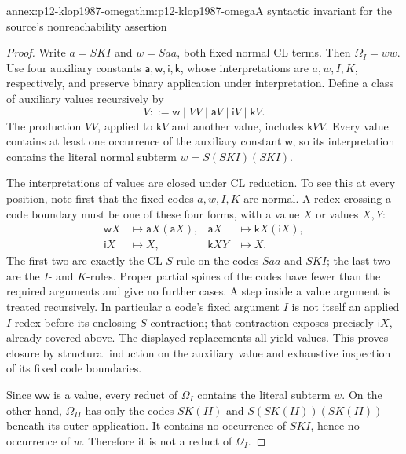 \begin{annexitem}{annex:p12-klop1987-omega}{thm:p12-klop1987-omega}{A syntactic invariant for the source's nonreachability assertion}
\begin{proof}
Write \(a=SKI\) and \(w=Saa\), both fixed normal CL terms.
Then \(\Omega_I=ww\). Use four auxiliary constants
\(\mathsf a,\mathsf w,\mathsf i,\mathsf k\), whose interpretations
are \(a,w,I,K\), respectively, and preserve binary application under
interpretation. Define a class of auxiliary values recursively by
\[
 V::=\mathsf w\mid VV\mid\mathsf a V
       \mid\mathsf i V\mid\mathsf k V.
\]
The production \(VV\), applied to \(\mathsf k V\) and another
value, includes \(\mathsf k V V\). Every value contains at least
one occurrence of the auxiliary constant \(\mathsf w\), so its
interpretation contains the literal normal subterm \(w=S(SKI)(SKI)\).

The interpretations of values are closed under CL reduction. To see
this at every position, note first that the fixed codes \(a,w,I,K\)
are normal. A redex crossing a code boundary must be one of these four
forms, with a value \(X\) or values \(X,Y\):
\begin{align*}
 \mathsf w X&\longmapsto\mathsf a X(\mathsf a X),&
 \mathsf a X&\longmapsto\mathsf k X(\mathsf i X),\\
 \mathsf i X&\longmapsto X,&
 \mathsf k X Y&\longmapsto X.
\end{align*}
The first two are exactly the CL \(S\)-rule on the codes
\(Saa\) and \(SKI\); the last two are the \(I\)- and
\(K\)-rules. Proper partial spines of the codes have fewer than the
required arguments and give no further cases. A step inside a value
argument is treated recursively. In particular a code's fixed argument
\(I\) is not itself an applied \(I\)-redex before its enclosing
\(S\)-contraction; that contraction exposes precisely
\(\mathsf i X\), already covered above. The displayed replacements
all yield values. This proves closure by structural induction on the
auxiliary value and exhaustive inspection of its fixed code boundaries.

Since \(\mathsf w\mathsf w\) is a value, every reduct of
\(\Omega_I\) contains the literal subterm \(w\). On the other
hand, \(\Omega_{II}\) has only the codes \(SK(II)\) and
\(S(SK(II))(SK(II))\) beneath its outer application. It contains
no occurrence of \(SKI\), hence no occurrence of \(w\).
Therefore it is not a reduct of \(\Omega_I\).


\end{proof}
\end{annexitem}
